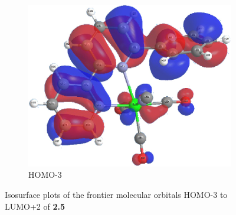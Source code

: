 \begin{figure}[!ht]
\begin{subfigure}[b]{0.31\textwidth}
  \includegraphics[clip=true, width=\textwidth, keepaspectratio]{images/mos/5h-3.eps}
  \caption{HOMO-3}
 \end{subfigure}
\caption[Molecular orbitals HOMO-3 to LUMO+2 of \textbf{2.5}]{Isosurface plots of the frontier molecular orbitals HOMO-3 to LUMO+2 of \textbf{2.5}}
\label{fig.mo25}
\end{figure} 

